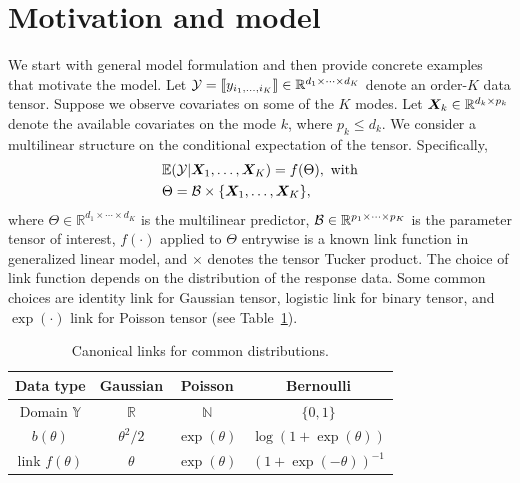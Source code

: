 \documentclass[12pt]{article}
\theoremstyle{plain}
\theoremstyle{definition}
\begin{document}
\section{Motivation and model}\label{sec:model}
We start with general model formulation and then provide concrete examples that motivate the model. Let $\mathcal{Y}=\llbracket y_{i_1,\ldots,i_K} \rrbracket\in\mathbb{R}^{d_1\times \cdots\times d_K}$ denote an order-$K$ data tensor. Suppose we observe covariates on some of the $K$ modes. Let $\bm X_k\in\mathbb{R}^{d_k\times p_k}$ denote the available covariates on the mode $k$, where $p_k\leq d_k$. We consider a multilinear structure on the conditional expectation of the tensor. Specifically, 
\begin{align}\label{eq:tensormodel}
&\mathbb{E}(\mathcal{Y}|\bm X_1,\ldots,\bm X_K)=f(\Theta),\ \text{with}\\
&\Theta =\mathcal{B}\times\{\bm X_1,\ldots,\bm X_K\} ,
\end{align}
where  $\Theta\in\mathbb{R}^{d_1\times \cdots\times d_K}$ is the multilinear predictor, $\mathcal{B}\in\mathbb{R}^{p_1\times \cdots \times p_K}$ is the parameter tensor of interest, $f(\cdot)$ applied to $\Theta$ entrywise is a known link function in generalized linear model, and $\times$ denotes the tensor Tucker product. The choice of link function depends on the distribution of the response data. Some common choices are identity link for Gaussian tensor, logistic link for binary tensor, and $\exp(\cdot)$ link for Poisson tensor (see Table~\ref{table:link}). 


\begin{table}[htb]
\centering
\begin{tabular}{c|ccc}
Data type &Gaussian & Poisson& Bernoulli\\
\hline
Domain $\mathbb{Y}$& $\mathbb{R}$&$\mathbb{N}$&$\{0,1\}$\\
 $b(\theta)$&$\theta^2/2$& $\exp(\theta)$&$\log (1+\exp(\theta))$\\
 link $f(\theta)$&$\theta$&$\exp(\theta)$&$(1+\exp(-\theta))^{-1}$
\end{tabular}
\caption{Canonical links for common distributions.}\label{table:link}
\end{table}
\end{document}
